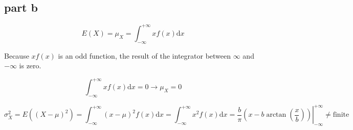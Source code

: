 \subsection{part b}
$$
E(X) = \mu_X = \int_{-\infty}^{+\infty} xf(x) \text{d}x
$$

Because $xf(x)$ is an odd function, the result of the integrator between $\infty$ and $-\infty$ is zero.

$$
\int_{-\infty}^{+\infty} xf(x) \text{d}x = 0 \to \mu_X = 0
$$

$$
\sigma^2_X = E((X-\mu)^2) = \int_{-\infty}^{+\infty} (x-\mu)^2 f(x) \text{d}x = \int_{-\infty}^{+\infty} x^2 f(x) \text{d}x = \left. \dfrac{b}{\pi}(x - b\arctan(\dfrac{x}{b})) \right|_{-\infty}^{+\infty} \neq \text{finite}
$$